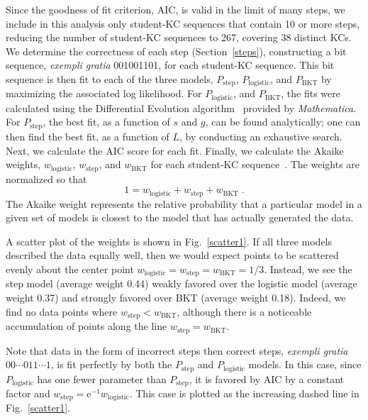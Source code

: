 \documentclass{edm_template}
\begin{document}
Since the goodness of fit criterion, AIC, is valid in the limit of
many steps, we include in this analysis only student-KC sequences that
contain 10 or more steps, reducing the number of student-KC sequences
to 267, covering 38 distinct KCs.  We determine the correctness of
each step (Section~\ref{steps}), constructing a bit sequence, {\em
exempli gratia} 001001101, for each student-KC sequence.  This bit
sequence is then fit to each of the three models, $P_\mathrm{step}$,
$P_\mathrm{logistic}$, and $P_\mathrm{BKT}$ by maximizing the
associated log likelihood.  
For $P_\mathrm{logistic}$, and $P_\mathrm{BKT}$, the fits were
calculated using the 
Differential Evolution algorithm~\cite{storn_differential_1997}
provided by {\em Mathematica}.
For $P_\mathrm{step}$, the best fit, as a function
of $s$ and $g$, can be found analytically; one can 
then find the best fit, as a function of $L$, 
by conducting an exhaustive search.
Next, we calculate the AIC score for each fit.  Finally,
we calculate the Akaike weights, $w_\mathrm{logistic}$,
$w_\mathrm{step}$, and $w_\mathrm{BKT}$ for each student-KC
sequence~\cite{burnham_model_2002}.
The weights are normalized so that
%
\begin{equation}
   1=w_\mathrm{logistic}+ w_\mathrm{step} + w_\mathrm{BKT} \; .
\end{equation}
%
The Akaike weight represents the relative probability that
a particular model in a given set of models is closest
to the model that has actually generated the data. 

A scatter plot of the weights is shown in Fig.~\ref{scatter1}.
If all three models described the data equally well, then
we would expect points to be scattered evenly about the  
center point $w_\mathrm{logistic}= w_\mathrm{step}= w_\mathrm{BKT}=1/3$.
Instead, we see the step model (average weight 0.44) weakly 
favored over the logistic model (average weight 0.37) and 
strongly favored over BKT (average weight 0.18).  Indeed, we 
find no data points where $w_\mathrm{step}< w_\mathrm{BKT}$,
although there is a noticeable accumulation of points along the line 
$w_\mathrm{step}= w_\mathrm{BKT}$.

Note that data in the form of incorrect steps then correct steps, 
{\it exempli gratia} $00\cdots 011\cdots 1$,
is fit perfectly by both the $P_\mathrm{step}$ and 
$P_\mathrm{logistic}$ models.  
In this case, since $P_\mathrm{logistic}$ has one fewer parameter
than $P_\mathrm{step}$, it is favored by AIC by a constant factor and
$w_\mathrm{step}=\mathrm{e}^{-1} w_\mathrm{logistic}$.  This case is
plotted as the increasing dashed line in Fig.~\ref{scatter1}.
\end{document}
